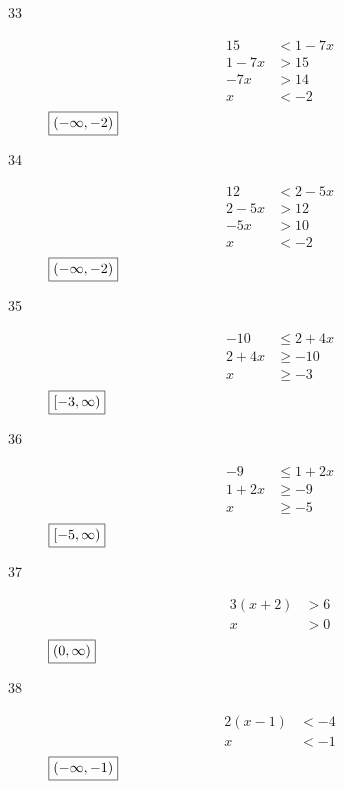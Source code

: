 \documentclass[letterpaper]{exam}
\begin{document}
\begin{description}
      \item[33]
        \begin{align*}
          15     & < 1 - 7x \\
          1 - 7x & > 15 \\
          -7x    & > 14 \\
          x      & < -2 \\
        \end{align*}
        $\boxed{ \intoo{ -\infty, -2 } }$

      \item[34]
        \begin{align*}
          12     & < 2 - 5x \\
          2 - 5x & > 12 \\
          -5x    & > 10 \\
          x      & < -2 \\
        \end{align*}
        $\boxed{ \intoo{ -\infty, -2 } }$ 

      \item[35]
        \begin{align*}
          -10    & \leq 2 + 4x \\
          2 + 4x & \geq -10 \\
          x      & \geq -3 \\
        \end{align*}
        $\boxed{ \intco{ -3, \infty} }$

      \item[36]
        \begin{align*}
          -9     & \leq 1 + 2x \\
          1 + 2x & \geq -9 \\
          x      & \geq -5 \\
        \end{align*}
        $\boxed{ \intco{ -5, \infty } }$

      \item[37]
        \begin{align*}
          3 (x + 2) & > 6 \\
          x         & > 0 \\
        \end{align*}
        $\boxed{ \intoo{ 0, \infty } }$

      \item[38]
        \begin{align*}
          2 (x - 1) & < -4 \\
          x         & < -1 \\
        \end{align*}
        $\boxed{ \intoo{ -\infty, -1 } }$


\end{description}
\end{document}
